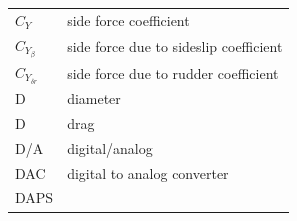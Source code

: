 \documentclass[
]{book}
\begin{document}
\begin{longtable}[]{@{}ll@{}}
\begin{minipage}[t]{0.47\columnwidth}\raggedright
\(C_Y\)\strut
\end{minipage} & \begin{minipage}[t]{0.47\columnwidth}\raggedright
side force coefficient\strut
\end{minipage}\tabularnewline
\begin{minipage}[t]{0.47\columnwidth}\raggedright
\(C_{Y_{\beta}}\)\strut
\end{minipage} & \begin{minipage}[t]{0.47\columnwidth}\raggedright
side force due to sideslip coefficient\strut
\end{minipage}\tabularnewline
\begin{minipage}[t]{0.47\columnwidth}\raggedright
\(C_{Y_{\delta r}}\)\strut
\end{minipage} & \begin{minipage}[t]{0.47\columnwidth}\raggedright
side force due to rudder coefficient\strut
\end{minipage}\tabularnewline
\begin{minipage}[t]{0.47\columnwidth}\raggedright
D\strut
\end{minipage} & \begin{minipage}[t]{0.47\columnwidth}\raggedright
diameter\strut
\end{minipage}\tabularnewline
\begin{minipage}[t]{0.47\columnwidth}\raggedright
D\strut
\end{minipage} & \begin{minipage}[t]{0.47\columnwidth}\raggedright
drag\strut
\end{minipage}\tabularnewline
\begin{minipage}[t]{0.47\columnwidth}\raggedright
D/A\strut
\end{minipage} & \begin{minipage}[t]{0.47\columnwidth}\raggedright
digital/analog\strut
\end{minipage}\tabularnewline
\begin{minipage}[t]{0.47\columnwidth}\raggedright
DAC\strut
\end{minipage} & \begin{minipage}[t]{0.47\columnwidth}\raggedright
digital to analog converter\strut
\end{minipage}\tabularnewline
\begin{minipage}[t]{0.47\columnwidth}\raggedright
DAPS\strut
\end{minipage} & \begin{minipage}[t]{0.47\columnwidth}\raggedright

\end{minipage}
\end{longtable}
\end{document}
